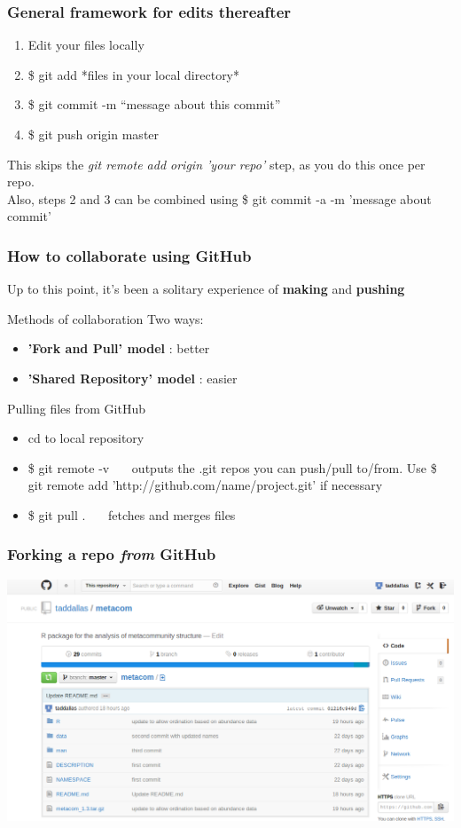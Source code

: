\documentclass{beamer}\usepackage{graphicx, color}
\begin{document}
\begin{frame}
 \frametitle{General framework for edits thereafter}
\begin{block}{}
 \begin{enumerate}
  \item Edit your files locally
  \item \$ git add *files in your local directory*
  \item \$ git commit -m ``message about this commit''
  \item \$ git push origin master 
 \end{enumerate}
\end{block}
This skips the \textit{git remote add origin 'your repo'} step, as you do this once per repo.\\
Also, steps 2 and 3 can be combined using \$ git commit -a -m 'message about commit' 
\end{frame}


\begin{frame}
\frametitle{How to collaborate using GitHub}
Up to this point, it's been a solitary experience of \textbf{making} and \textbf{pushing} \\
 \begin{block}{Methods of collaboration}
Two ways:
\begin{itemize}
 \item \textbf{'Fork and Pull' model} : better
 \item \textbf{'Shared Repository' model} : easier
\end{itemize}
\end{block}

\begin{alertblock}{Pulling files from GitHub}
 \begin{itemize}
  \item cd to local repository
  \item \$ git remote -v  \ \ \  outputs the .git repos you can push/pull to/from. Use \$ git remote add 'http://github.com/name/project.git' if necessary
  \item \$ git pull . \ \ \ fetches and merges files
 \end{itemize}
\end{alertblock}
\end{frame}


\begin{frame}
 \frametitle{Forking a repo \textit{from} GitHub}
 \includegraphics[width=\textwidth]{fork.png}\\
\end{frame}
\end{document}
